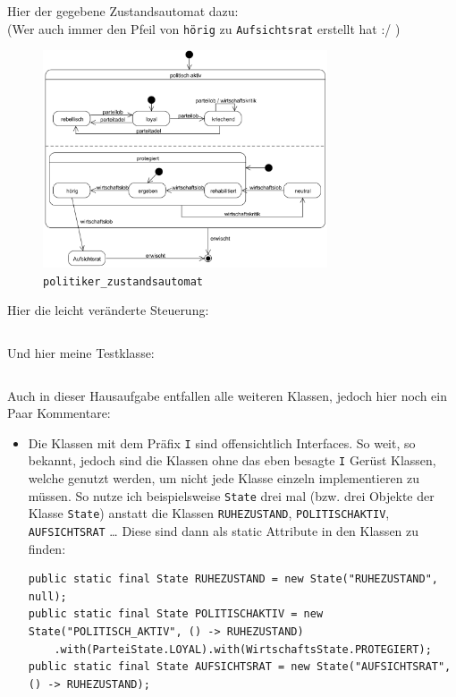 \documentclass{article}
\begin{document}
\begin{enumerate}[label=\alph*.]
            Hier der gegebene Zustandsautomat dazu:\\
            (Wer auch immer den Pfeil von \texttt{hörig} zu \texttt{Aufsichtsrat} erstellt hat :/ )

            \begin{figure}[ht]
                \centering
                \includegraphics[width=0.75\textwidth]{politiker_zustandsautomat.png}
                \caption{\texttt{politiker\_zustandsautomat}}
            \end{figure}

            \newpage
            Hier die leicht veränderte Steuerung:

            \inputminted{java}{Steuerung.java}

            \newpage
            Und hier meine Testklasse:
            \inputminted{java}{Test.java}

            Auch in dieser Hausaufgabe entfallen alle weiteren Klassen, jedoch hier noch ein Paar Kommentare:

            \begin{itemize}
                \item Die Klassen mit dem Präfix \texttt{I} sind offensichtlich Interfaces.
                    So weit, so bekannt, jedoch sind die Klassen ohne das eben besagte \texttt{I} Gerüst Klassen, welche genutzt werden, um nicht jede Klasse einzeln implementieren zu müssen.
                    So nutze ich beispielsweise \texttt{State} drei mal (bzw. drei Objekte der Klasse \texttt{State}) anstatt die Klassen \texttt{RUHEZUSTAND}, \texttt{POLITISCHAKTIV}, \texttt{AUFSICHTSRAT} \ldots
                    Diese sind dann als static Attribute in den Klassen zu finden:

                    \begin{verbatim}
public static final State RUHEZUSTAND = new State("RUHEZUSTAND", null);
public static final State POLITISCHAKTIV = new State("POLITISCH_AKTIV", () -> RUHEZUSTAND)
    .with(ParteiState.LOYAL).with(WirtschaftsState.PROTEGIERT);
public static final State AUFSICHTSRAT = new State("AUFSICHTSRAT", () -> RUHEZUSTAND);
                    \end{verbatim}


\end{itemize}
\end{enumerate}
\end{document}
